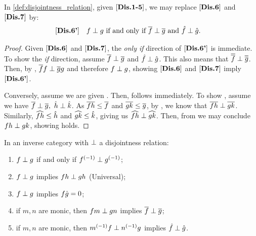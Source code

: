 \begin{lemma}\label{lem:disjointness_equivalent_axioms}
  In \ref{def:disjointness_relation}, given $[\text{\bfseries {Dis}.{1-5}}]$, we may
  replace $[\text{\bfseries {Dis}.{6}}]$ and $[\text{\bfseries {Dis}.{7}}]$ by:
  \begin{align*}
    [\text{\bfseries {Dis}.{6'}}]\quad &f\perp g\text{ if and only if }\overline{f} \perp \overline{g}
      \text{ and }\hat{f}\perp\hat{g}.
  \end{align*}
\end{lemma}
\begin{proof}
  Given $[\text{\bfseries {Dis}.{6}}]$ and $[\text{\bfseries {Dis}.{7}}]$, the \emph{only if} direction of $[\text{\bfseries {Dis}.{6'}}]$ is
  immediate. To show the \emph{if} direction, assume $\overline{f} \perp \overline{g}$ and
  $\hat{f}\perp\hat{g}$. This also means that $\overline{\overline{f}} \perp \overline{\overline{g}}$. Then, by
  , $\overline{f} f \perp \overline{g}g$ and therefore $f \perp g$, showing $[\text{\bfseries {Dis}.{6}}]$
  and $[\text{\bfseries {Dis}.{7}}]$ imply $[\text{\bfseries {Dis}.{6'}}]$.

  Conversely, assume we are given . Then,  follows immediately. To show
  , assume we have $\rst{f}\cdperp \rst{g},\ \rg{h}\cdperp \rg{k}$. As
  $\overline{f h} \le \overline{f}$ and $\overline{g k}\le\overline{g}$, by , we know that
  $\overline{f h} \perp \overline{g k}$. Similarly, $\widehat{f h} \le \hat{h}$ and $\widehat{g k} \le \hat{k}$,
  giving us $\widehat{f h}\perp \widehat{g k}$. Then, from  we may conclude
  $f h \perp g k$, showing  holds.
\end{proof}
\begin{lemma}\label{lem:disjointness_various}
  In an inverse category \X with $\perp$ a disjointness relation:
  \begin{enumerate}[{(}i{)}]
    \item $f \perp g$ if and only if ${f}^{(-1)}\perp {g}^{(-1)}$; \label{lemitem:djv_inverses}
    \item $f \perp g$ implies $f h \perp g h$ (Universal);\label{lemitem:djv_universal}
    \item $f \perp g$ implies $f\hat{g} = 0$; \label{lemitem:djv_disjoint_composition_is_0}
    \item if $m,n$ are monic, then $f m \perp g n$ implies $\overline{f} \perp \overline{g}$;
      \label{lemitem:djv_monic_implies}
    \item if $m,n$ are monic, then ${m}^{(-1)} f \perp {n}^{(-1)}g$ implies $\hat{f} \perp \hat{g}$.
      \label{lemitem:djv_inv_monic_implies}
  \end{enumerate}
\end{lemma}
